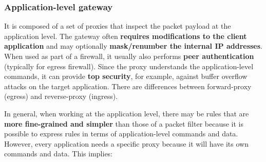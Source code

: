 
\subsubsection{Application-level gateway}
It is composed of a set of proxies that inspect the packet payload at the application level. The gateway often \textbf{requires modifications to the client application} and may optionally \textbf{mask/renumber the internal IP addresses}. When used as part of a firewall, it usually also performs \textbf{peer authentication} (typically for egress firewall). Since the proxy understands the application-level commands, it can provide \textbf{top security}, for example, against buffer overflow attacks on the target application. There are differences between forward-proxy (egress) and reverse-proxy (ingress).

In general, when working at the application level, there may be rules that are \textbf{more fine-grained and simpler} than those of a packet filter because it is possible to express rules in terms of application-level commands and data. However, every application needs a specific proxy because it will have its own commands and data. This implies:

